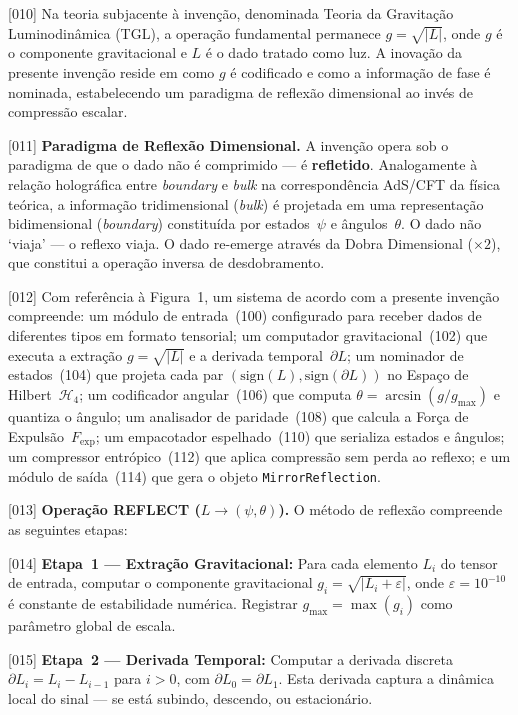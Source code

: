 \documentclass[12pt,a4paper]{article}
\newcommand{\Fexp}{F_{\text{exp}}}
\newcommand{\Hfour}{\mathcal{H}_4}
\begin{document}
{[010]} Na teoria subjacente à invenção, denominada Teoria da
Gravitação Luminodinâmica (TGL), a operação fundamental
permanece $g = \sqrt{|L|}$, onde $g$ é o componente
gravitacional e $L$ é o dado tratado como luz. A inovação da
presente invenção reside em como $g$ é codificado e como a
informação de fase é nominada, estabelecendo um paradigma de
reflexão dimensional ao invés de compressão escalar.

{[011]} \textbf{Paradigma de Reflexão Dimensional.} A invenção
opera sob o paradigma de que o dado não é comprimido --- é
\textbf{refletido}. Analogamente à relação holográfica entre
\textit{boundary} e \textit{bulk} na correspondência AdS/CFT da
física teórica, a informação tridimensional (\textit{bulk}) é
projetada em uma representação bidimensional
(\textit{boundary}) constituída por estados~$\psi$ e
ângulos~$\theta$. O dado não `viaja' --- o reflexo viaja. O
dado re-emerge através da Dobra Dimensional ($\times 2$), que
constitui a operação inversa de desdobramento.

{[012]} Com referência à Figura~1, um sistema de acordo com a
presente invenção compreende: um módulo de entrada~(100)
configurado para receber dados de diferentes tipos em formato
tensorial; um computador gravitacional~(102) que executa a
extração $g = \sqrt{|L|}$ e a derivada temporal~$\partial L$;
um nominador de estados~(104) que projeta cada par
$(\text{sign}(L), \text{sign}(\partial L))$ no Espaço de
Hilbert~$\Hfour$; um codificador angular~(106) que computa
$\theta = \arcsin(g/g_{\max})$ e quantiza o ângulo; um
analisador de paridade~(108) que calcula a Força de
Expulsão~$\Fexp$; um empacotador espelhado~(110) que serializa
estados e ângulos; um compressor entrópico~(112) que aplica
compressão sem perda ao reflexo; e um módulo de saída~(114) que
gera o objeto \texttt{MirrorReflection}.

{[013]} \textbf{Operação REFLECT ($L \to (\psi, \theta)$).} O
método de reflexão compreende as seguintes etapas:

{[014]} \textbf{Etapa~1 --- Extração Gravitacional:} Para cada
elemento $L_i$ do tensor de entrada, computar o componente
gravitacional $g_i = \sqrt{|L_i + \varepsilon|}$, onde
$\varepsilon = 10^{-10}$ é constante de estabilidade numérica.
Registrar $g_{\max} = \max(g_i)$ como parâmetro global de
escala.

{[015]} \textbf{Etapa~2 --- Derivada Temporal:} Computar a
derivada discreta $\partial L_i = L_i - L_{i-1}$ para
$i > 0$, com $\partial L_0 = \partial L_1$. Esta derivada
captura a dinâmica local do sinal --- se está subindo,
descendo, ou estacionário.
\end{document}
